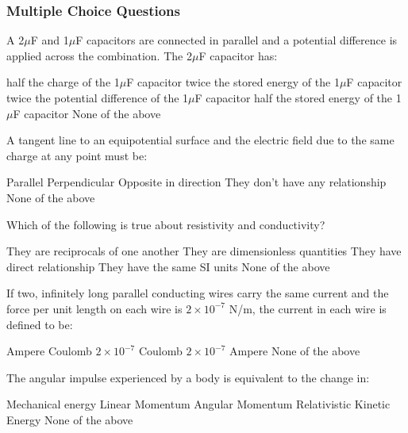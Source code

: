 \documentclass[13pt,addpoints]{exam}
\begin{document}
{{{\begin{questions}
					\subsubsection*{Multiple Choice Questions}
					\question A 2$\mu$F and 1$\mu$F capacitors are connected in parallel and a potential difference is applied across the combination. The 2$\mu$F capacitor has:
					\begin{oneparchoices}
						\choice half the charge of the 1$\mu$F capacitor
						\choice twice the stored energy of the 1$\mu$F capacitor
						\choice twice the potential difference of the 1$\mu$F capacitor
						\choice half the stored energy of the 1$\mu$F capacitor
						\choice None of the above
					\end{oneparchoices}
					\question A tangent line to an equipotential surface and the electric field due to the same charge at any point must be:\\
					\begin{oneparchoices}
						\choice Parallel
						\choice Perpendicular
						\choice Opposite in direction
						\choice They don't have any relationship
						\choice None of the above
					\end{oneparchoices}
					\question Which of the following is true about resistivity and conductivity?\\
					\begin{oneparchoices}
						\choice They are reciprocals of one another
						\choice They are dimensionless quantities
						\choice They have direct relationship
						\choice They have the same SI units
						\choice None of the above
					\end{oneparchoices}
					\question If two, infinitely long parallel conducting wires carry the same current and the force per unit length on each wire is $2\times10^{-7}$ N/m, the current in each wire is defined to be:\\
					\begin{oneparchoices}
						\choice 1 Ampere
						\choice 1 Coulomb
						\choice $2\times10^{-7}$ Coulomb
						\choice $2\times10^{-7}$ Ampere
						\choice None of the above
					\end{oneparchoices}
					\question The angular impulse experienced by a body is equivalent to the change in:\\
					\begin{oneparchoices}
						\choice Mechanical energy
						\choice Linear Momentum
						\choice Angular Momentum
						\choice Relativistic Kinetic Energy
						\choice None of the above

\end{oneparchoices}
\end{questions}}}}
\end{document}
